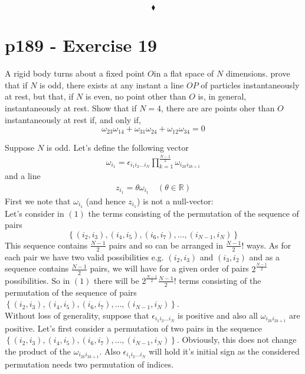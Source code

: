 $$\blacklozenge$$
\newpage


\section{p189 - Exercise 19}
\begin{tcolorbox}
A rigid body turns about a fixed point $O$in a flat space of $N$ dimensions. prove that if $N$ is odd, there exists at any instant a line $OP$ of particles instantaneously at rest, but that, if $N$ is even, no point other than $O$ is, in general, instantaneously at rest. Show that if $N=4$, there are are points oher than $O$ instantaneously at rest if, and only if,
$$\omega_{23}\omega_{14}+\omega_{31}\omega_{24}+\omega_{12}\omega_{34}=0$$
\end{tcolorbox} 
Suppose $N$ is odd. Let's define the following vector
\begin{align}
\omega_{i_1}= \epsilon_{i_{1} i_{2} \dots i_{N}}\prod_{k=1}^{\frac{N-1}{2}}\omega_{i_{2k} i_{2k+1}}
\end{align}
and a line
\begin{align}
z_{i_1} = \theta \omega_{i_1}\quad (\theta \in \mathbb{R})
\end{align}
First we note that $\omega_{i_1}$ (and hence $z_{i_1}$) is not a null-vector:\\
Let's consider in $(1)$ the terms consisting of the permutation of the sequence of pairs $$\left\{\left( i_2,i_3 \right),\left( i_4,i_5 \right),\left( i_6,i_7\right),\dots ,\left( i_{N-1},i_N \right)\right\}$$ This sequence contains $\frac{N-1}{2}$ pairs and so can be arranged in $\frac{N-1}{2}!$ ways. As for each pair we have two valid possibilities e.g. $\left( i_2,i_3 \right)$ and $\left( i_3,i_2 \right)$ and as a sequence contains $\frac{N-1}{2}$ pairs, we will have for a given order of pairs $2^{\frac{N-1}{2}}$ possibilities. So in $(1)$ there will be $2^{\frac{N-1}{2}}\frac{N-1}{2}!$ terms consisting of the permutation of the sequence of pairs $\left\{\left( i_2,i_3 \right),\left( i_4,i_5 \right),\left( i_6,i_7\right),\dots ,\left( i_{N-1},i_N \right)\right\}$.\\
Without loss of generality, suppose that $\epsilon_{i_{1} i_{2} \dots i_{N}}$ is positive and also all $\omega_{i_{2k} i_{2k+1}}$ are positive.
Let's first consider a permutation of two pairs in the sequence $\left\{\left( i_2,i_3 \right),\left( i_4,i_5 \right),\left( i_6,i_7\right),\dots ,\left( i_{N-1},i_N \right)\right\}$. Obviously, this does not change the product of the $\omega_{i_{2k} i_{2k+1}}$. Also $\epsilon_{i_{1} i_{2} \dots i_{N}}$ will hold it's initial sign as the considered permutation needs two permutation of indices.\\
